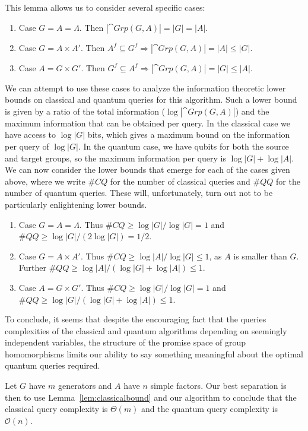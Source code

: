 This lemma allows us to consider several specific cases:
\begin{enumerate}
\item Case $G=A=\Lambda$.  Then $|\cat{Grp}(G,A)| = |G|=|A|$.
\item Case $G=A\times A'$. Then $A^f\subseteq G^f \Rightarrow |\cat{Grp}(G,A)| = |A| \le |G|$.
\item Case $A=G\times G'$. Then $G^f\subseteq A^f \Rightarrow |\cat{Grp}(G,A)| = |G| \le |A|$.
\end{enumerate}
\noindent We can attempt to use these cases to analyze the information theoretic lower bounds on classical and quantum queries for this algorithm.  Such a lower bound is given by a ratio of the total information ($\log|\cat{Grp}(G,A)|$) and the maximum information that can be obtained per query.  In the classical case we have access to $\log|G|$ bits, which gives a maximum bound on the information per query of $\log|G|$. In the quantum case, we have qubits for both the source and target groups, so the maximum information per query is $\log|G|+\log|A|$. We can now consider the lower bounds that emerge for each of the cases given above, where we write $\#CQ$ for the number of classical queries and $\#QQ$ for the number of quantum queries. These will, unfortunately, turn out not to be particularly enlightening lower bounds.
\begin{enumerate}
\item Case $G=A=\Lambda$. Thus $\#CQ\ge\log|G|/\log|G|=1$ and $\#QQ\ge\log|G|/(2\log|G|)=1/2$.
\item Case $G=A\times A'$. Thus $\#CQ\ge\log|A|/\log|G|\le1$, as $A$ is smaller than $G$. Further $\#QQ\ge\log|A|/(\log|G|+\log|A|)\le1.$
\item Case $A=G\times G'$. Thus $\#CQ\ge\log|G|/\log|G|=1$ and $\#QQ\ge\log|G|/(\log|G|+\log|A|)\le1.$
\end{enumerate}

To conclude, it seems that despite the encouraging fact that the queries complexities of the classical and quantum algorithms depending on seemingly independent variables, the structure of the promise space of group homomorphisms limits our ability to say something meaningful about the optimal quantum queries required. 

Let $G$ have $m$ generators and $A$ have $n$ simple factors. Our best separation is then to use Lemma~\ref{lem:classicalbound} and our algorithm to conclude that the classical query complexity is $\Theta(m)$ and the quantum query complexity is $\mathcal{O}(n)$.

